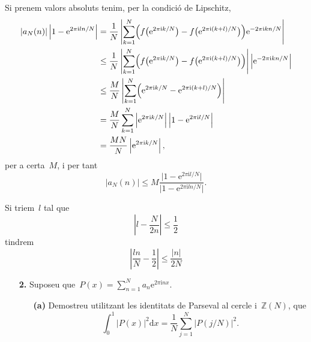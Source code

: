 \documentclass[a4paper]{article}
\theoremstyle{plain}
\theoremstyle{definition}
\newcommand{\iu}{\mathrm{i}}
\newcommand{\e}{\mathrm{e}}
\providecommand{\uppi}{\pi}
\newcommand{\diff}{\mathrm{d}}
\newcommand{\abs}[1]{\lvert{#1}\rvert}
\newcommand{\Abs}[1]{\left\lvert{#1}\right\rvert}
\newcommand{\ZZ}{\mathbb{Z}}
\begin{document}
Si prenem valors absoluts tenim, per la condició de Lipschitz,
\begin{align*}
    \abs{a_{N}(n)}
    \Abs{1-\e^{2\uppi\iu ln/N}}
    &=
    \frac{1}{N}
    \Abs{
        \sum_{k=1}^{N}
        \Bigl(
            f\bigl(
                \e^{2\uppi\iu k/N}
            \bigr)
            -
            f\bigl(
                \e^{2\uppi\iu(k+l)/N}
            \bigr)
        \Bigr)
        \e^{-2\uppi\iu kn/N}
    } \\
    &\leq
    \frac{1}{N}
    \Abs{
        \sum_{k=1}^{N}
        \Bigl(
            f\bigl(
                \e^{2\uppi\iu k/N}
            \bigr)
            -
            f\bigl(
                \e^{2\uppi\iu(k+l)/N}
            \bigr)
        \Bigr)
    }
    \Abs{
        \e^{-2\uppi\iu kn/N}
    } \\
    &\leq
    \frac{M}{N}
    \Abs{
        \sum_{k=1}^{N}
        \Bigl(
            \e^{2\uppi\iu k/N}
            -
            \e^{2\uppi\iu(k+l)/N}
        \Bigr)
    } \\
    &=
    \frac{M}{N}
    \sum_{k=1}^{N}
    \Abs{\e^{2\uppi\iu k/N}}
    \Abs{1-\e^{2\uppi\iu l/N}} \\
    &=
    \frac{MN}{N}
    \Abs{\e^{2\uppi\iu k/N}},
\end{align*}
per a certa~\(M\),
i per tant
\[
    \abs{a_{N}(n)}
    \leq
    M
    \frac{\abs{1-\e^{2\uppi\iu l/N}}}{\abs{1-\e^{2\uppi\iu ln/N}}}.
\]

Si triem~\(l\) tal que
\[
    \Abs{l-\frac{N}{2n}}
    \leq
    \frac{1}{2}
\]
tindrem
\[
    \Abs{\frac{ln}{N} - \frac{1}{2}}
    \leq
    \frac{\abs{n}}{2N}
\]

\begin{enumerate}
    \item[\textbf{2.}] Suposeu
        que~\(\displaystyle P(x)=\sum_{n=1}^{N}a_{n}\e^{2\uppi\iu nx}\).
        \begin{enumerate}
            \item[\textbf{(a)}] Demostreu utilitzant les identitats de Parseval
                al cercle i~\(\ZZ(N)\), que
                \[
                    \int_{0}^{1}
                    \abs{P(x)}^{2}
                    \diff x
                    =
                    \frac{1}{N}
                    \sum_{j=1}^{N}
                    \abs{P(j/N)}^{2}.
                \]
        \end{enumerate}
\end{enumerate}
\end{document}
